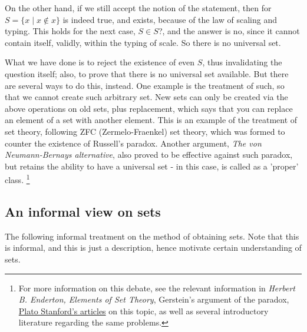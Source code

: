 On the other hand, if we still accept the notion of the statement, then for $S=\{x\mid x\not\in x\}$ is indeed true, and exists, because of the law of scaling and typing. This holds for the next case, $S\in S$?, and the answer is no, since it cannot contain itself, validly, within the typing of scale. So there is no universal set. 

What we have done is to reject the existence of even $S$, thus invalidating the question itself; also, to prove that there is no universal set available. But there are several ways to do this, instead. One example is the treatment of such, so that we cannot create such arbitrary set. New sets can only be created via the above operations on old sets, plus replacement, which says that you can replace an element of a set with another element. This is an example of the treatment of set theory, following ZFC (Zermelo-Fraenkel) set theory, which was formed to counter the existence of Russell's paradox. Another argument, \textit{The von Neumann-Bernays alternative}, also proved to be effective against such paradox, but retains the ability to have a universal set - in this case, is called as a 'proper' class. \footnote{For more information on this debate, see the relevant information in \textit{Herbert B. Enderton, Elements of Set Theory}, Gerstein's argument of the paradox, \href{https://plato.stanford.edu/entries/russell-paradox/}{Plato Stanford's articles} on this topic, as well as several introductory literature regarding the same problems.}

\subsection{An informal view on sets}
The following informal treatment on the method of obtaining sets. Note that this is informal, and this is just a description, hence motivate certain understanding of sets. 

